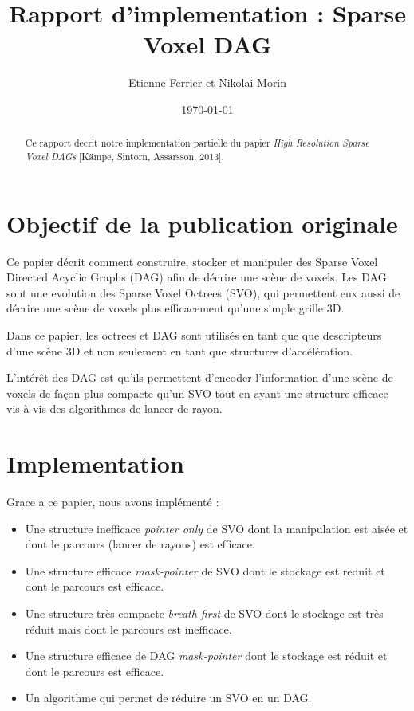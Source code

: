 \documentclass[a4paper]{article}
\title{Rapport d'implementation : Sparse Voxel DAG}
\author{Etienne Ferrier et Nikolai Morin}
\date{\today}
\begin{document}
\maketitle

\begin{abstract}
Ce rapport decrit notre implementation partielle du papier \textit{High Resolution Sparse Voxel DAGs} [Kämpe, Sintorn, Assarsson, 2013].
\end{abstract}

\section{Objectif de la publication originale}

Ce papier décrit comment construire, stocker et manipuler des Sparse Voxel Directed Acyclic Graphs (DAG) afin de décrire une scène de voxels. Les DAG sont une evolution des Sparse Voxel Octrees (SVO), qui permettent eux aussi de décrire une scène de voxels plus efficacement qu’une simple grille 3D.

Dans ce papier, les octrees et DAG sont utilisés en tant que que descripteurs d’une scène 3D et non seulement en tant que structures d’accélération.

L’intérêt des DAG est qu’ils permettent d’encoder l’information d'une scène de voxels de façon plus compacte qu’un SVO tout en ayant une structure efficace vis-à-vis des algorithmes de lancer de rayon.


\section{Implementation}

Grace a ce papier, nous avons implémenté :\\

\begin{itemize}
  \item Une structure inefficace \textit{pointer only} de SVO dont la manipulation est aisée et dont le parcours (lancer de rayons) est efficace.
  \item Une structure efficace \textit{mask-pointer} de SVO dont le stockage est reduit et dont le parcours est efficace.
  \item Une structure très compacte \textit{breath first} de SVO dont le stockage est très réduit mais dont le parcours est inefficace.
  \item Une structure efficace de DAG \textit{mask-pointer} dont le stockage est réduit et dont le parcours est efficace.
  \item Un algorithme qui permet de réduire un SVO en un DAG.\\
\end{itemize}
\end{document}
